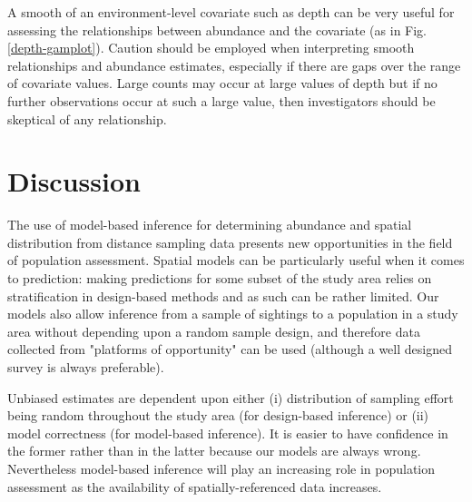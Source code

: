 \documentclass[a4paper,12pt]{article}
\begin{document}
A smooth of an environment-level covariate such as depth can be very useful for assessing the relationships between abundance and the covariate (as in Fig. \ref{depth-gamplot}). Caution should be employed when interpreting smooth relationships and abundance estimates, especially if there are gaps over the range of covariate values. Large counts may occur at large values of depth but if no further observations occur at such a large value, then investigators should be skeptical of any relationship.



\section*{Discussion}
\label{s:discussion}

The use of model-based inference for determining abundance and spatial distribution from distance sampling data presents new opportunities in the field of population assessment. Spatial models can be particularly useful when it comes to prediction: making predictions for some subset of the study area relies on stratification in design-based methods and as such can be rather limited. Our models also allow inference from a sample of sightings to a population in a study area without depending upon a random sample design, and therefore data collected from "platforms of opportunity" \citep{Williams:2006tz} can be used (although a well designed survey is always preferable).

Unbiased estimates are dependent upon either (i) distribution of sampling effort being random throughout the study area (for design-based inference) or (ii) model correctness (for model-based inference).  It is easier to have confidence in the former rather than in the latter because our models are always wrong. Nevertheless model-based inference will play an increasing role in population assessment as the availability of spatially-referenced data increases.
\end{document}
